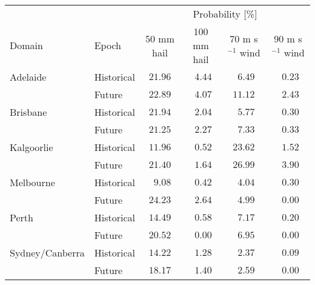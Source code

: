 \begin{tabular}{llcccc}
\hline
& & \multicolumn{4}{c}{Probability [\%]} \\ 
Domain & Epoch & 50 mm hail & 100 mm hail & 70 m s$^{-1}$ wind & \multicolumn{1}{c}{90 m s$^{-1}$ wind} \\ 
\hline
Adelaide & Historical  & $21.96$ & $\phantom{0}4.44$ & $\phantom{0}6.49$ & $\phantom{0}0.23$ \\
 & Future  & $22.89$ & $\phantom{0}4.07$ & $11.12$ & $\phantom{0}2.43$ \\
Brisbane & Historical  & $21.94$ & $\phantom{0}2.04$ & $\phantom{0}5.77$ & $\phantom{0}0.30$ \\
 & Future  & $21.25$ & $\phantom{0}2.27$ & $\phantom{0}7.33$ & $\phantom{0}0.33$ \\
Kalgoorlie & Historical  & $11.96$ & $\phantom{0}0.52$ & $23.62$ & $\phantom{0}1.52$ \\
 & Future  & $21.40$ & $\phantom{0}1.64$ & $26.99$ & $\phantom{0}3.90$ \\
Melbourne & Historical  & $\phantom{0}9.08$ & $\phantom{0}0.42$ & $\phantom{0}4.04$ & $\phantom{0}0.30$ \\
 & Future  & $24.23$ & $\phantom{0}2.64$ & $\phantom{0}4.99$ & $\phantom{0}0.00$ \\
Perth & Historical  & $14.49$ & $\phantom{0}0.58$ & $\phantom{0}7.17$ & $\phantom{0}0.20$ \\
 & Future  & $20.52$ & $\phantom{0}0.00$ & $\phantom{0}6.95$ & $\phantom{0}0.00$ \\
Sydney/Canberra & Historical  & $14.22$ & $\phantom{0}1.28$ & $\phantom{0}2.37$ & $\phantom{0}0.09$ \\
 & Future  & $18.17$ & $\phantom{0}1.40$ & $\phantom{0}2.59$ & $\phantom{0}0.00$ \\
\hline 
\end{tabular}
